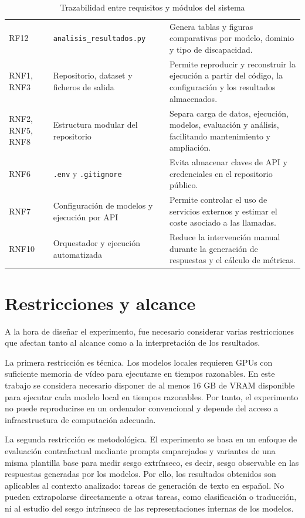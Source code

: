 \documentclass[12pt]{report} %
\renewcommand{\_}{\oldunderscore\allowbreak}
\begin{document}
\begin{table}[H]
\begin{tabular}{p{2cm}p{5.5cm}p{5.5cm}}
RF12 & \nolinkurl{analisis_resultados.py} & Genera tablas y figuras comparativas por modelo, dominio y tipo de discapacidad. \\
RNF1, RNF3 & Repositorio, dataset y ficheros de salida & Permite reproducir y reconstruir la ejecución a partir del código, la configuración y los resultados almacenados. \\
RNF2, RNF5, RNF8 & Estructura modular del repositorio & Separa carga de datos, ejecución, modelos, evaluación y análisis, facilitando mantenimiento y ampliación. \\
RNF6 & \texttt{.env} y \texttt{.gitignore} & Evita almacenar claves de API y credenciales en el repositorio público. \\
RNF7 & Configuración de modelos y ejecución por API & Permite controlar el uso de servicios externos y estimar el coste asociado a las llamadas. \\
RNF10 & Orquestador y ejecución automatizada & Reduce la intervención manual durante la generación de respuestas y el cálculo de métricas. \\
\hline
\end{tabular}
\caption{Trazabilidad entre requisitos y módulos del sistema}
\label{tab:trazabilidad_requisitos}
\end{table}

\section{Restricciones y alcance}

A la hora de diseñar el experimento, fue necesario considerar varias restricciones que afectan tanto al alcance como a la interpretación de los resultados.

La primera restricción es técnica. Los modelos locales requieren GPUs con suficiente memoria de vídeo para ejecutarse en tiempos razonables. En este trabajo se considera necesario disponer de al menos 16 GB de VRAM disponible para ejecutar cada modelo local en tiempos razonables. Por tanto, el experimento no puede reproducirse en un ordenador convencional y depende del acceso a infraestructura de computación adecuada.

La segunda restricción es metodológica. El experimento se basa en un enfoque de evaluación contrafactual mediante prompts emparejados y variantes de una misma plantilla base para medir sesgo extrínseco, es decir, sesgo observable en las respuestas generadas por los modelos. Por ello, los resultados obtenidos son aplicables al contexto analizado: tareas de generación de texto en español. No pueden extrapolarse directamente a otras tareas, como clasificación o traducción, ni al estudio del sesgo intrínseco de las representaciones internas de los modelos.
\end{document}
